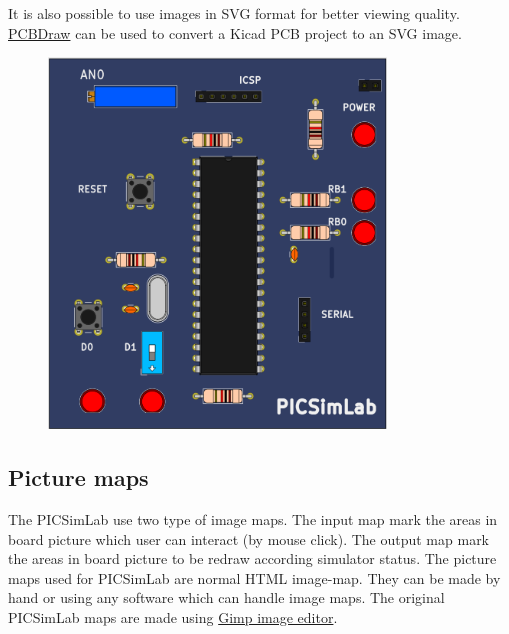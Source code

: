 It is also possible to use images in SVG format for better viewing quality. \href{https://github.com/yaqwsx/PcbDraw}{PCBDraw} can be used to convert a Kicad PCB project to 
an SVG image. 

\begin{figure}[H]
\center
\includegraphics[width=0.8\textwidth]{files/share/board_svg.png} 
\end{figure} 

\pagebreak
\subsection{Picture maps}
The PICSimLab use two type of image maps. 
The input map mark the areas in board picture which user can interact (by mouse click). 
The output map mark the areas in board picture to be redraw according simulator status. 
The picture maps used for PICSimLab are normal HTML image-map. They can be made by hand or using any software which can handle image maps. The original PICSimLab maps are made using \href{http://www.gimp.org/}{Gimp image editor}.     

